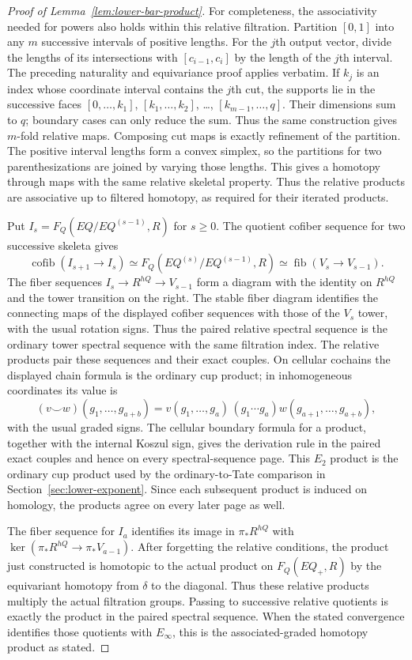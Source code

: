 \begin{proof}[Proof of Lemma~\ref{lem:lower-bar-product}]
For completeness, the associativity needed for powers also holds within
this relative filtration.  Partition $[0,1]$ into any $m$ successive
intervals of positive lengths.  For the $j$th output vector, divide
the lengths of its intersections with $[c_{i-1},c_i]$ by the length of
the $j$th interval.  The preceding naturality and equivariance proof
applies verbatim.  If $k_j$ is an index whose coordinate interval
contains the $j$th cut, the supports lie in the successive faces
$[0,\ldots,k_1]$, $[k_1,\ldots,k_2]$, \ldots,
$[k_{m-1},\ldots,q]$.  Their dimensions sum to $q$; boundary cases
can only reduce the sum.  Thus the same construction gives $m$-fold
relative maps.  Composing cut maps is exactly refinement of the
partition.  The positive interval lengths form a convex simplex, so
the partitions for two parenthesizations are joined by varying those
lengths.  This gives a homotopy through maps with the same relative
skeletal property.  Thus the relative products are associative up to
filtered homotopy, as required for their iterated products.

Put $I_s=F_Q(EQ/EQ^{(s-1)},R)$ for $s\geq0$.  The quotient cofiber
sequence for two successive skeleta gives
\[
 \operatorname{cofib}(I_{s+1}\to I_s)
 \simeq F_Q(EQ^{(s)}/EQ^{(s-1)},R)
 \simeq \operatorname{fib}(V_s\to V_{s-1}).
\]
The fiber sequences $I_s\to R^{hQ}\to V_{s-1}$ form a diagram with
the identity on $R^{hQ}$ and the tower transition on the right.
The stable fiber diagram identifies the connecting maps of the
displayed cofiber sequences with those of the $V_s$ tower, with the
usual rotation signs.  Thus the paired relative spectral sequence is
the ordinary tower spectral sequence with the same filtration index.
The relative products pair these sequences and their exact couples.
On cellular cochains the displayed chain formula is the ordinary cup
product; in inhomogeneous coordinates its value is
\[
 (v\smile w)(g_1,\ldots,g_{a+b})
 =v(g_1,\ldots,g_a)\,(g_1\cdots g_a)
       w(g_{a+1},\ldots,g_{a+b}),
\]
with the usual graded signs.  The cellular boundary formula for a
product, together with the internal Koszul sign, gives the derivation
rule in the paired exact couples and hence on every spectral-sequence
page.  This $E_2$ product is the ordinary cup product used by the
ordinary-to-Tate comparison in Section~\ref{sec:lower-exponent}.
Since each subsequent product
is induced on homology, the products agree on every later page as well.

The fiber sequence for $I_a$ identifies its image in $\pi_*R^{hQ}$ with
$\ker(\pi_*R^{hQ}\to\pi_*V_{a-1})$. After
forgetting the relative conditions, the product just constructed is
homotopic to the actual product on $F_Q(EQ_+,R)$ by the equivariant
homotopy from $\delta$ to the diagonal.  Thus these relative products
multiply the actual filtration groups.  Passing to successive relative
quotients is exactly the product in the paired spectral sequence.
When the stated convergence identifies those quotients with
$E_\infty$, this is the associated-graded homotopy product as stated.
\end{proof}
